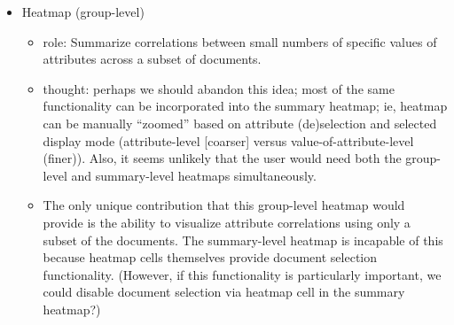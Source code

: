 \documentclass[11pt,letterpaper]{article}
\begin{document}
\begin{itemize}
\item Heatmap (group-level)
\begin{itemize}
\item role: Summarize correlations between small numbers of specific values of attributes across a subset of documents.
\item thought: perhaps we should abandon this idea; most of the same functionality can be incorporated into the summary heatmap; ie, heatmap can be manually ``zoomed'' based on attribute (de)selection and selected display mode (attribute-level [coarser] versus value-of-attribute-level (finer)). Also, it seems unlikely that the user would need both the group-level and summary-level heatmaps simultaneously. 
\item The only unique contribution that this group-level heatmap would provide is the ability to visualize attribute correlations using only a subset of the documents. The summary-level heatmap is incapable of this because heatmap cells themselves provide document selection functionality. (However, if this functionality is particularly important, we could disable document selection via heatmap cell in the summary heatmap?)
\end{itemize}


\end{itemize}
\end{document}
